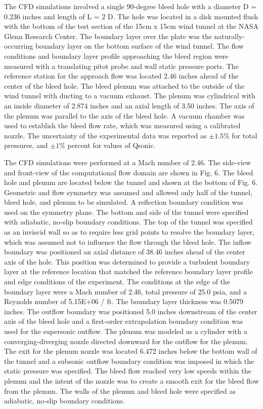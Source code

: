 The CFD simulations involved a single 90-degree bleed hole with a diameter D = 0.236 inches and length of L = 2 D. The hole was located in a disk mounted flush with the bottom of the test section of the 15cm x 15cm wind tunnel at the NASA Glenn Research Center. The boundary layer over the plate was the naturally-occurring boundary layer on the bottom surface of the wind tunnel. The flow conditions and boundary layer profile approaching the bleed region were measured with a translating pitot probe and wall static pressure ports. The reference station for the approach flow was located 2.46 inches ahead of the center of the bleed hole. The bleed plenum was attached to the outside of the wind tunnel with ducting to a vacuum exhaust. The plenum was cylindrical with an inside diameter of 2.874 inches and an axial length of 3.50 inches. The axis of the plenum was parallel to the axis of the bleed hole. A vacuum chamber was used to establish the bleed flow rate, which was measured using a calibrated nozzle. The uncertainty of the experimental data was reported as $\pm1.5 \%$ for total pressures, and $\pm 1 \%$ percent for values of Qsonic. 

The CFD simulations were performed at a Mach number of 2.46. The side-view and front-view of the computational flow domain are shown in Fig. 6. The bleed hole and plenum are located below the tunnel and shown at the bottom of Fig. 6. Geometric and flow symmetry was assumed and allowed only half of the tunnel, bleed hole, and plenum to be simulated. A reflection boundary condition was used on the symmetry plane. The bottom and side of the tunnel were specified with adiabatic, no-slip boundary conditions. The top of the tunnel was specified as an inviscid wall so as to require less grid points to resolve the boundary layer, which was assumed not to influence the flow through the bleed hole. The inflow boundary was positioned an axial distance of 38.46 inches ahead of the center axis of the hole. This position was determined to provide a turbulent boundary layer at the reference location that matched the reference boundary layer profile and edge conditions of the experiment. The  conditions at the edge of the boundary layer were a Mach number of 2.46, total pressure of 25.0 psia, and a Reynolds number of 5.15E+06 / ft. The boundary layer thickness was 0.5079 inches. The outflow boundary was positioned 5.0 inches downstream of the center axis of the bleed hole and a first-order extrapolation boundary condition was used for the supersonic outflow. The plenum was modeled as a cylinder with a converging-diverging nozzle directed downward for the outflow for the plenum. The exit for the plenum nozzle was located 6.472 inches below the bottom wall of the tunnel and a subsonic outflow boundary condition was imposed in which the static pressure was specified. The bleed flow reached very low speeds within the plenum and the intent of the nozzle was to create a smooth exit for the bleed flow from the plenum. The walls of the plenum and bleed hole were specified as adiabatic, no-slip boundary conditions.

